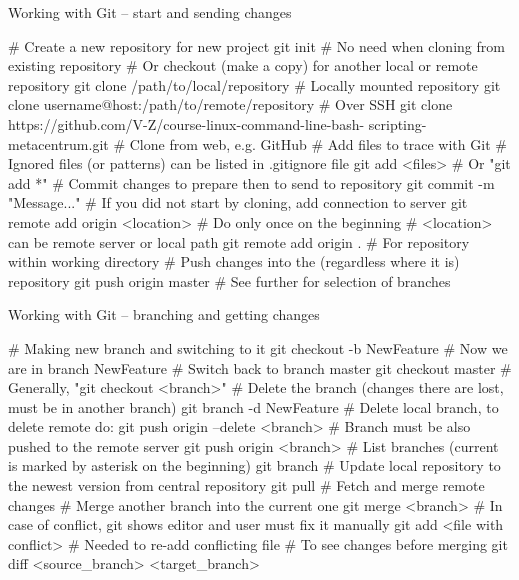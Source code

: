 \documentclass[compress, ucs, xelatex, 11pt, xcolor=svgnames,
  hyperref={
    bookmarks=true,
    unicode=true,
    colorlinks=true,
    pdftitle={Linux, command line and MetaCentrum},
    plainpages=false,
    pdfauthor={Vojtech Zeisek},
    pdfsubject={Course about use of Linux command line, writing shell scripts and using MetaCentrum of CESNET},
    pdfcreator={XeLaTeX},
    pdfkeywords={Linux, GNU, BASH, shell, command line, MetaCentrum},
    linkcolor=DarkRed,
    anchorcolor=DarkBlue,
    citecolor=Indigo,
    filecolor=NavyBlue,
    menucolor=DarkMagenta,
    urlcolor=DarkBlue,
    pdftex},
  url={hyphens, lowtilde} %
  ]{beamer}
\begin{document}
\begin{frame}[fragile]{Working with Git -- start and sending changes}
  \begin{bashcode}
    # Create a new repository for new project
    git init # No need when cloning from existing repository
    # Or checkout (make a copy) for another local or remote repository
    git clone /path/to/local/repository # Locally mounted repository
    git clone username@host:/path/to/remote/repository # Over SSH
    git clone https://github.com/V-Z/course-linux-command-line-bash-
      scripting-metacentrum.git # Clone from web, e.g. GitHub
    # Add files to trace with Git
    # Ignored files (or patterns) can be listed in .gitignore file
    git add <files> # Or "git add *"
    # Commit changes to prepare then to send to repository
    git commit -m "Message..."
    # If you did not start by cloning, add connection to server
    git remote add origin <location> # Do only once on the beginning
    # <location> can be remote server or local path
    git remote add origin . # For repository within working directory
    # Push changes into the (regardless where it is) repository
    git push origin master # See further for selection of branches
  \end{bashcode}
\end{frame}

\begin{frame}[fragile]{Working with Git -- branching and getting changes}
  \begin{bashcode}
    # Making new branch and switching to it
    git checkout -b NewFeature # Now we are in branch NewFeature
    # Switch back to branch master
    git checkout master # Generally, "git checkout <branch>"
    # Delete the branch (changes there are lost, must be in another branch)
    git branch -d NewFeature # Delete local branch, to delete remote do:
    git push origin --delete <branch>
    # Branch must be also pushed to the remote server
    git push origin <branch>
    # List branches (current is marked by asterisk on the beginning)
    git branch
    # Update local repository to the newest version from central repository
    git pull # Fetch and merge remote changes
    # Merge another branch into the current one
    git merge <branch>
    # In case of conflict, git shows editor and user must fix it manually
    git add <file with conflict> # Needed to re-add conflicting file
    # To see changes before merging
    git diff <source_branch> <target_branch>
  \end{bashcode}
\end{frame}
\end{document}
